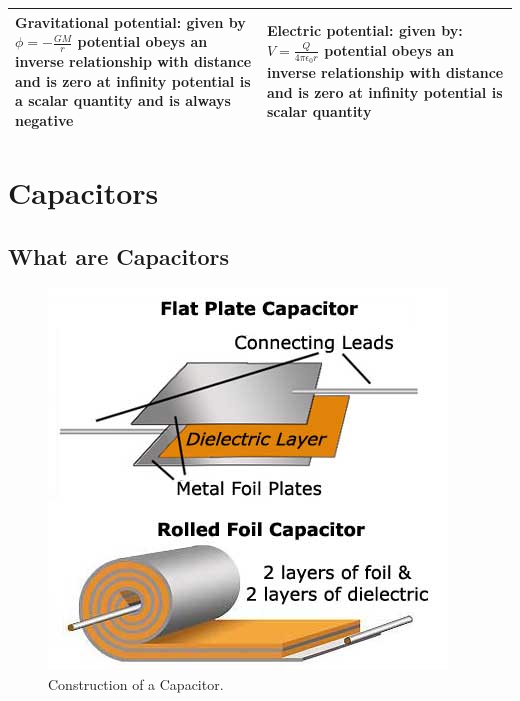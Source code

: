 \documentclass{scrbook}
\begin{document}
\begin{tabular}{| p{0.5\linewidth} | p{0.5\linewidth} |}
		\textbf{Gravitational potential: } \newline given by $\phi = -\frac{GM}{r}$ \newline potential obeys an inverse relationship with distance and is zero at infinity \newline potential is a scalar quantity and is always negative & \textbf{Electric potential: } \newline given by: $V = \frac{Q}{4\pi \epsilon_0 r}$ \newline potential obeys an inverse relationship with distance and is zero at infinity \newline potential is scalar quantity \\ \hline
	\end{tabular}

\section{Capacitors}

\subsection{What are Capacitors}

	\begin{figure}
		\centering
		\includegraphics[width=\linewidth]{assets/capacitor.jpg}
		\caption{Construction of a Capacitor. \cite{lrnabtelec:cap}}
		\label{capint}
	\end{figure}
\end{document}
